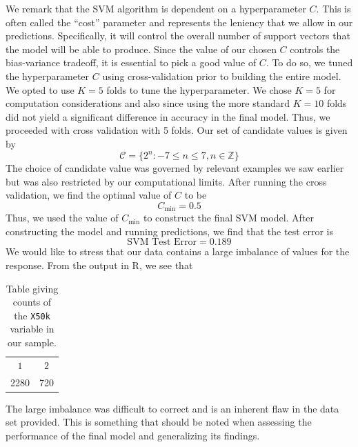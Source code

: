 \documentclass{article}
\begin{document}
    We remark that the SVM algorithm is dependent on a hyperparameter $C$. This is often called the ``cost'' parameter and represents the leniency that we allow in our predictions. Specifically, it will control the overall number of support vectors that the model will be able to produce. Since the value of our chosen $C$ controls the bias-variance tradeoff, it is essential to pick a good value of $C$. To do so, we tuned the hyperparameter $C$ using cross-validation prior to building the entire model. We opted to use $K = 5$ folds to tune the hyperparameter. We chose $K = 5$ for computation considerations and also since using the more standard $K = 10$ folds did not yield a significant difference in accuracy in the final model. Thus, we proceeded with cross validation with 5 folds. Our set of candidate values is given by 
    \begin{equation}
    		\mathcal{C} = \{2^n : -7 \leq n \leq 7, n\in \mathbb{Z}\}
    \end{equation}
    The choice of candidate value was governed by relevant examples we saw earlier but was also restricted by our computational limits. After running the cross validation, we find the optimal value of $C$ to be 
    \begin{equation}
    		C_{\text{min}} = 0.5
    \end{equation}
    Thus, we used the value of $C_{\text{min}}$ to construct the final SVM model. After constructing the model and running predictions, we find that the test error is 
    \begin{equation}
    		\text{SVM Test Error} = 0.189
    \end{equation}
    We would like to stress that our data contains a large imbalance of values for the response. From the output in R, we see that 
    \begin{table}[H]
    		\centering
    		\begin{tabular}{cc}
    			\toprule 
    			$1$ & $2$ \\ 
    			2280 & 720 \\ 
    			\bottomrule
    		\end{tabular}
    		\caption{Table giving counts of the \texttt{X50k} variable in our sample.}
    		\label{tab:countsX50kSample}
    \end{table}
    The large imbalance was difficult to correct and is an inherent flaw in the data set provided. This is something that should be noted when assessing the performance of the final model and generalizing its findings. \par 
    
\end{document}
